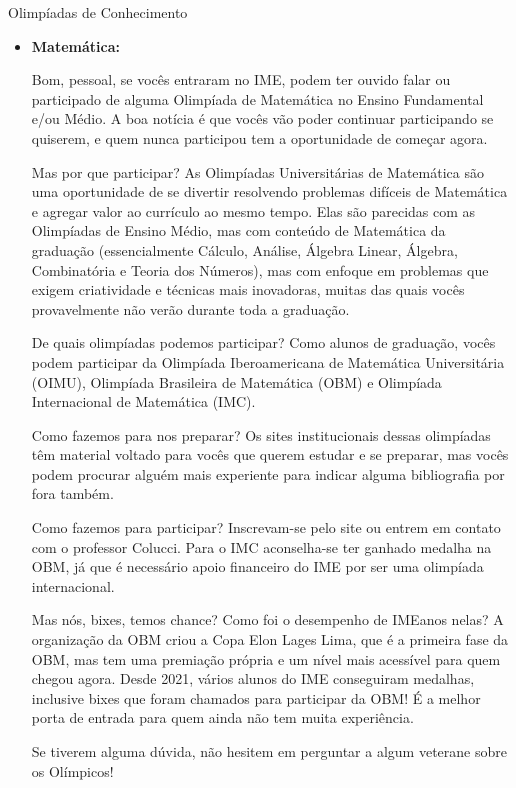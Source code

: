 \begin{subsecao}{Olimpíadas de Conhecimento}

\begin{itemize}

\item{\bf Matemática: }

Bom, pessoal, se vocês entraram no IME, podem ter ouvido falar ou participado
de alguma Olimpíada de Matemática no Ensino Fundamental e/ou Médio. A
boa notícia é que vocês vão poder continuar participando se quiserem,
e quem nunca participou tem a oportunidade de começar agora.

Mas por que participar? As Olimpíadas Universitárias de Matemática são uma
oportunidade de se divertir resolvendo problemas difíceis de Matemática e agregar
valor ao currículo ao mesmo tempo. Elas são parecidas com as Olimpíadas de
Ensino Médio, mas com conteúdo de Matemática da graduação (essencialmente
Cálculo, Análise, Álgebra Linear, Álgebra, Combinatória e Teoria dos Números),
mas com enfoque em problemas que exigem criatividade e técnicas mais inovadoras,
muitas das quais vocês provavelmente não verão durante toda a graduação.

De quais olimpíadas podemos participar? Como alunos de graduação, vocês podem
participar da Olimpíada Iberoamericana de Matemática Universitária (OIMU),
Olimpíada Brasileira de Matemática (OBM) e Olimpíada Internacional de
Matemática (IMC).

Como fazemos para nos preparar? Os sites institucionais dessas olimpíadas
têm material voltado para vocês que querem estudar e se preparar, mas vocês
podem procurar alguém mais experiente para indicar alguma bibliografia por fora
também. 

Como fazemos para participar? Inscrevam-se pelo site ou entrem em contato com
o professor Colucci. Para o IMC aconselha-se ter ganhado medalha na OBM,
já que é necessário apoio financeiro do IME por ser uma olimpíada internacional.

Mas nós, bixes, temos chance? Como foi o desempenho de IMEanos nelas? A organização 
da OBM criou a Copa Elon Lages Lima, que é a primeira fase da OBM, mas tem uma 
premiação própria e um nível mais acessível para quem chegou agora. Desde 2021, 
vários alunos do IME conseguiram medalhas, inclusive bixes que foram chamados para participar 
da OBM! É a melhor porta de entrada para quem ainda não tem muita experiência. 

Se tiverem alguma dúvida, não hesitem em perguntar a algum veterane sobre os
Olímpicos!


\end{itemize}
\end{subsecao}
